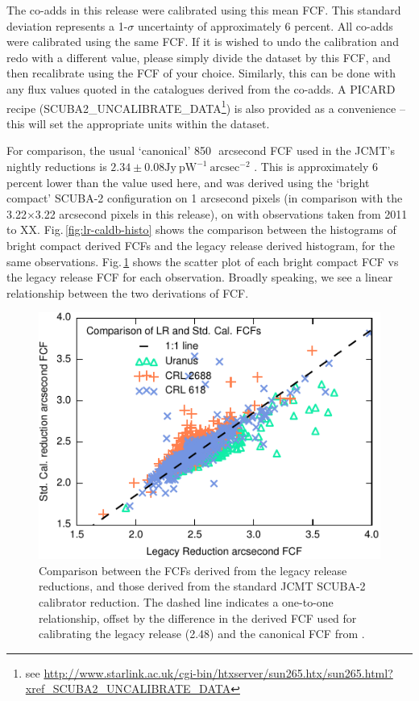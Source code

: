\documentclass[twocolumn]{aastex6}
\begin{document}
The co-adds in this release were calibrated using this mean FCF.  This
standard deviation represents a 1-$\sigma$ uncertainty of
approximately 6 percent. All co-adds were calibrated using the same
FCF. If it is wished to undo the calibration and redo with a different
value, please simply divide the dataset by this FCF, and then
recalibrate using the FCF of your choice. Similarly, this can be done
with any flux values quoted in the catalogues derived from the
co-adds. A PICARD recipe (SCUBA2\_UNCALIBRATE\_DATA\footnote{see
  \url{http://www.starlink.ac.uk/cgi-bin/htxserver/sun265.htx/sun265.html?xref_SCUBA2_UNCALIBRATE_DATA}})
is also provided as a convenience -- this will set the appropriate
units within the dataset.

For comparison, the usual `canonical' 850\,\micron\ arcsecond FCF used
in the JCMT's nightly reductions is $2.34 \pm 0.08 \mathrm{Jy}\
\mathrm{pW}^{-1}\ \mathrm{arcsec}^{-2}$ \citep{Dempsey2013}. This is
approximately 6 percent lower than the value used here, and was
derived using the `bright compact' SCUBA-2 configuration on 1
arcsecond pixels (in comparison with the 3.22$\times$3.22 arcsecond
pixels in this release), on with observations taken from 2011 to
XX. Fig.\,\ref{fig:lr-caldb-histo} shows the comparison between the
histograms of bright compact derived FCFs and the legacy release
derived histogram, for the same
observations. Fig.\,\ref{fig:lr-caldb-scatter} shows the scatter plot
of each bright compact FCF vs the legacy release FCF for each
observation. Broadly speaking, we see a linear relationship between
the two derivations of FCF.

\begin{figure}
\includegraphics{legacyFCF-caldbFCF-scatter.pdf}
\caption{Comparison between the FCFs derived from the legacy release
  reductions, and those derived from the standard JCMT SCUBA-2
  calibrator reduction. The dashed line indicates a one-to-one
  relationship, offset by the difference in the derived FCF used for
  calibrating the legacy release (2.48) and the canonical FCF from
  \citet[2.34]{Dempsey2013}. \label{fig:lr-caldb-scatter} }
\end{figure}
\end{document}

